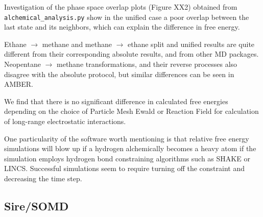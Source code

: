 \documentclass[journal=jctcce,manuscript=article]{achemso}
\newcommand{\progname}[1]{\texttt{#1}}
\begin{document}
Investigation of the phase space overlap plots (Figure XX2) obtained from \progname{alchemical\_analysis.py} 
show in the unified case a poor overlap between the last state and its neighbors, 
which can explain the difference in free energy. 


Ethane $\rightarrow$ methane and methane $\rightarrow$ ethane split and unified 
results are quite different from their corresponding absolute results, and from other MD packages. %
Neopentane $\rightarrow$ methane transformations, and their reverse processes 
also disagree with the absolute protocol, but similar differences can be seen in AMBER.

We find that there is no significant difference in calculated free energies depending on the choice of 
Particle Mesh Ewald or Reaction Field for calculation of long-range electrostatic interactions. 

One particularity of the software worth mentioning is 
that relative free energy simulations will blow up if a hydrogen alchemically becomes a heavy 
atom if the simulation employs hydrogen bond constraining algorithms such as SHAKE or LINCS.
Successful simulations seem to require turning off the constraint and decreasing the time step.

\subsection{Sire/SOMD}
\label{sec:somd-results}
\end{document}
